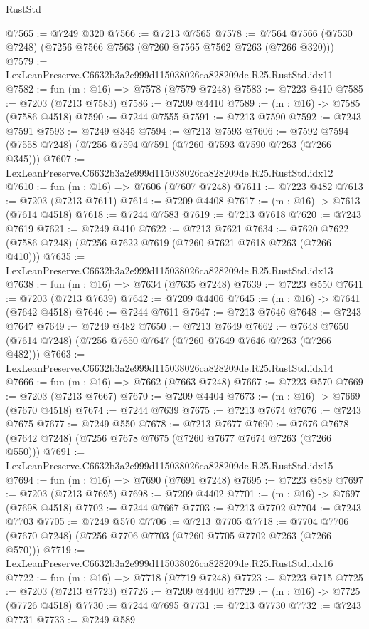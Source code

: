 \begin{lexlean}{RustStd}
\begin{coremodule}
@7565 := @7249 @320
@7566 := @7213 @7565
@7578 := @7564 @7566 (@7530 @7248) (@7256 @7566 @7563 (@7260 @7565 @7562 @7263 (@7266 @320)))
@7579 := LexLeanPreserve.C6632b3a2e999d115038026ca828209de.R25.RustStd.idx11
@7582 := fun (m : @16) => @7578 (@7579 @7248)
@7583 := @7223 @410
@7585 := @7203 (@7213 @7583)
@7586 := @7209 @4410
@7589 := (m : @16) -> @7585 (@7586 @4518)
@7590 := @7244 @7555
@7591 := @7213 @7590
@7592 := @7243 @7591
@7593 := @7249 @345
@7594 := @7213 @7593
@7606 := @7592 @7594 (@7558 @7248) (@7256 @7594 @7591 (@7260 @7593 @7590 @7263 (@7266 @345)))
@7607 := LexLeanPreserve.C6632b3a2e999d115038026ca828209de.R25.RustStd.idx12
@7610 := fun (m : @16) => @7606 (@7607 @7248)
@7611 := @7223 @482
@7613 := @7203 (@7213 @7611)
@7614 := @7209 @4408
@7617 := (m : @16) -> @7613 (@7614 @4518)
@7618 := @7244 @7583
@7619 := @7213 @7618
@7620 := @7243 @7619
@7621 := @7249 @410
@7622 := @7213 @7621
@7634 := @7620 @7622 (@7586 @7248) (@7256 @7622 @7619 (@7260 @7621 @7618 @7263 (@7266 @410)))
@7635 := LexLeanPreserve.C6632b3a2e999d115038026ca828209de.R25.RustStd.idx13
@7638 := fun (m : @16) => @7634 (@7635 @7248)
@7639 := @7223 @550
@7641 := @7203 (@7213 @7639)
@7642 := @7209 @4406
@7645 := (m : @16) -> @7641 (@7642 @4518)
@7646 := @7244 @7611
@7647 := @7213 @7646
@7648 := @7243 @7647
@7649 := @7249 @482
@7650 := @7213 @7649
@7662 := @7648 @7650 (@7614 @7248) (@7256 @7650 @7647 (@7260 @7649 @7646 @7263 (@7266 @482)))
@7663 := LexLeanPreserve.C6632b3a2e999d115038026ca828209de.R25.RustStd.idx14
@7666 := fun (m : @16) => @7662 (@7663 @7248)
@7667 := @7223 @570
@7669 := @7203 (@7213 @7667)
@7670 := @7209 @4404
@7673 := (m : @16) -> @7669 (@7670 @4518)
@7674 := @7244 @7639
@7675 := @7213 @7674
@7676 := @7243 @7675
@7677 := @7249 @550
@7678 := @7213 @7677
@7690 := @7676 @7678 (@7642 @7248) (@7256 @7678 @7675 (@7260 @7677 @7674 @7263 (@7266 @550)))
@7691 := LexLeanPreserve.C6632b3a2e999d115038026ca828209de.R25.RustStd.idx15
@7694 := fun (m : @16) => @7690 (@7691 @7248)
@7695 := @7223 @589
@7697 := @7203 (@7213 @7695)
@7698 := @7209 @4402
@7701 := (m : @16) -> @7697 (@7698 @4518)
@7702 := @7244 @7667
@7703 := @7213 @7702
@7704 := @7243 @7703
@7705 := @7249 @570
@7706 := @7213 @7705
@7718 := @7704 @7706 (@7670 @7248) (@7256 @7706 @7703 (@7260 @7705 @7702 @7263 (@7266 @570)))
@7719 := LexLeanPreserve.C6632b3a2e999d115038026ca828209de.R25.RustStd.idx16
@7722 := fun (m : @16) => @7718 (@7719 @7248)
@7723 := @7223 @715
@7725 := @7203 (@7213 @7723)
@7726 := @7209 @4400
@7729 := (m : @16) -> @7725 (@7726 @4518)
@7730 := @7244 @7695
@7731 := @7213 @7730
@7732 := @7243 @7731
@7733 := @7249 @589

\end{coremodule}
\end{lexlean}
